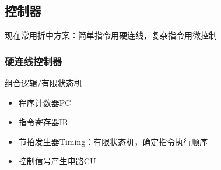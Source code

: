 \subsection{控制器}
现在常用折中方案：简单指令用硬连线，复杂指令用微控制
\subsubsection{硬连线控制器}
组合逻辑/有限状态机
\begin{itemize}
	\item 程序计数器PC
	\item 指令寄存器IR
	\item 节拍发生器Timing：有限状态机，确定指令执行顺序
	\item 控制信号产生电路CU
\end{itemize}

